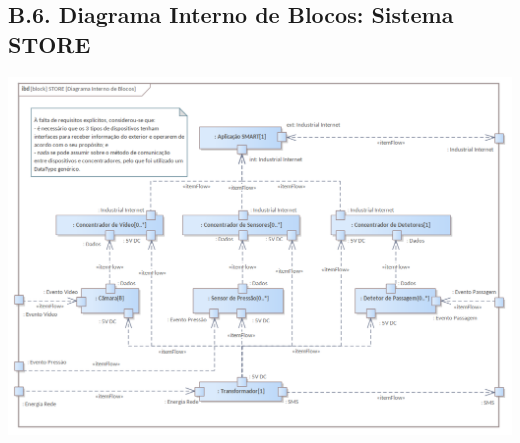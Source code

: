 \documentclass[12pt,a4paper]{article}
\begin{document}
\begin{landscape}
	\section*{B.6. Diagrama Interno de Blocos: Sistema STORE}
	\includegraphics[width=1.31\textwidth]{../iBD_STORE.png}
\end{landscape}
\end{document}
